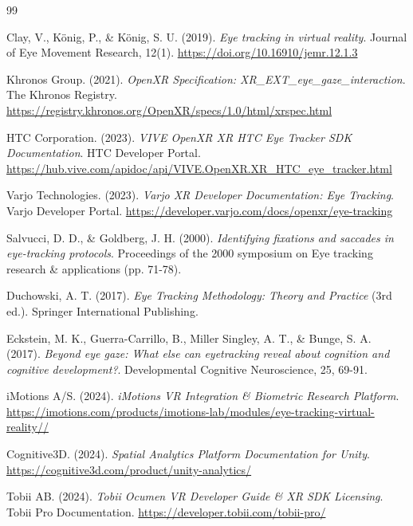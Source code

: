 \documentclass[12pt,a4paper]{article}
\begin{document}
\newpage
\begin{thebibliography}{99}

    Clay, V., König, P., \& König, S. U. (2019).
    \textit{Eye tracking in virtual reality}.
    Journal of Eye Movement Research, 12(1). \url{https://doi.org/10.16910/jemr.12.1.3}

    Khronos Group. (2021).
    \textit{OpenXR Specification: XR\_EXT\_eye\_gaze\_interaction}.
    The Khronos Registry. \url{https://registry.khronos.org/OpenXR/specs/1.0/html/xrspec.html}

    HTC Corporation. (2023).
    \textit{VIVE OpenXR XR HTC Eye Tracker SDK Documentation}.
    HTC Developer Portal. \url{https://hub.vive.com/apidoc/api/VIVE.OpenXR.XR_HTC_eye_tracker.html}

    Varjo Technologies. (2023).
    \textit{Varjo XR Developer Documentation: Eye Tracking}.
    Varjo Developer Portal. \url{https://developer.varjo.com/docs/openxr/eye-tracking}

    Salvucci, D. D., \& Goldberg, J. H. (2000).
    \textit{Identifying fixations and saccades in eye-tracking protocols}.
    Proceedings of the 2000 symposium on Eye tracking research \& applications (pp. 71-78).

    Duchowski, A. T. (2017).
    \textit{Eye Tracking Methodology: Theory and Practice} (3rd ed.).
    Springer International Publishing.

    Eckstein, M. K., Guerra-Carrillo, B., Miller Singley, A. T., \& Bunge, S. A. (2017).
    \textit{Beyond eye gaze: What else can eyetracking reveal about cognition and cognitive development?}.
    Developmental Cognitive Neuroscience, 25, 69-91.

    iMotions A/S. (2024).
    \textit{iMotions VR Integration \& Biometric Research Platform}.
    \url{https://imotions.com/products/imotions-lab/modules/eye-tracking-virtual-reality//}

    Cognitive3D. (2024).
    \textit{Spatial Analytics Platform Documentation for Unity}.
    \url{https://cognitive3d.com/product/unity-analytics/}

    Tobii AB. (2024).
    \textit{Tobii Ocumen VR Developer Guide \& XR SDK Licensing}.
    Tobii Pro Documentation. \url{https://developer.tobii.com/tobii-pro/}


\end{thebibliography}
\end{document}
